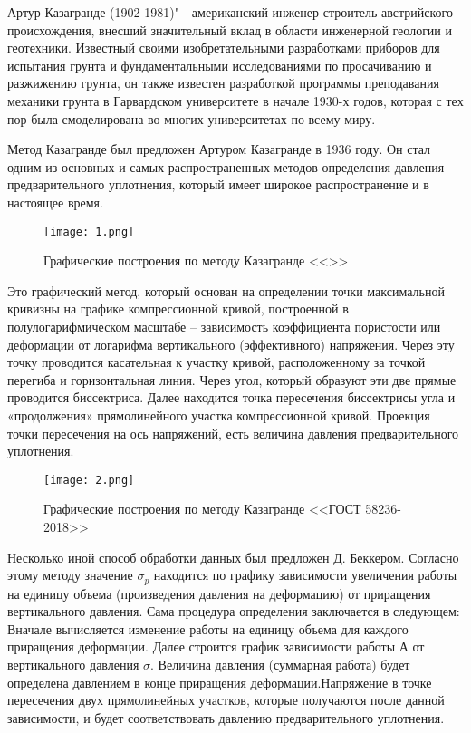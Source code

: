  
 Артур Казагранде (1902-1981)"---американский инженер-строитель австрийского происхождения, внесший значительный вклад в области инженерной геологии и геотехники. Известный своими изобретательными разработками приборов для испытания грунта и фундаментальными исследованиями по просачиванию и разжижению грунта, он также известен разработкой программы преподавания механики грунта в Гарвардском университете в начале 1930-х годов, которая с тех пор была смоделирована во многих университетах по всему миру. 
 
 Метод Казагранде был предложен Артуром Казагранде в 1936 году. Он стал одним из основных и самых распространенных методов определения давления предварительного уплотнения, который имеет широкое распространение и в настоящее время.

 \begin{figure}[h]
  \texttt{[image: 1.png]}
  \caption{Графические построения по методу Казагранде <<\cite{Kazagrande_1936}>>}
 \end{figure}


 Это графический метод, который основан на определении точки максимальной кривизны на графике компрессионной кривой, построенной в полулогарифмическом масштабе – зависимость коэффициента пористости или деформации от логарифма вертикального (эффективного) напряжения. Через эту точку проводится касательная к участку кривой, расположенному за точкой перегиба и горизонтальная линия. Через угол, который образуют эти две прямые проводится биссектриса. Далее находится точка пересечения биссектрисы угла и «продолжения» прямолинейного участка компрессионной кривой. Проекция точки пересечения на ось напряжений, есть величина давления предварительного уплотнения. 

 \begin{figure}[ht]
  \texttt{[image: 2.png]}
  \caption{Графические построения по методу Казагранде <<ГОСТ 58236-2018>>}
\end{figure}
 
   Несколько иной способ обработки данных был предложен Д. Беккером. Согласно этому методу значение $\sigma_p$ находится по графику зависимости увеличения работы на единицу объема (произведения давления на деформацию) от приращения вертикального давления. Сама процедура определения заключается в следующем: Вначале вычисляется изменение работы на единицу объема для каждого приращения деформации. Далее строится график зависимости работы А от вертикального давления $\sigma$. Величина давления (суммарная работа)  будет определена давлением в конце приращения деформации.Напряжение в точке пересечения двух прямолинейных участков, которые получаются после данной зависимости, и будет соответствовать давлению предварительного уплотнения.

